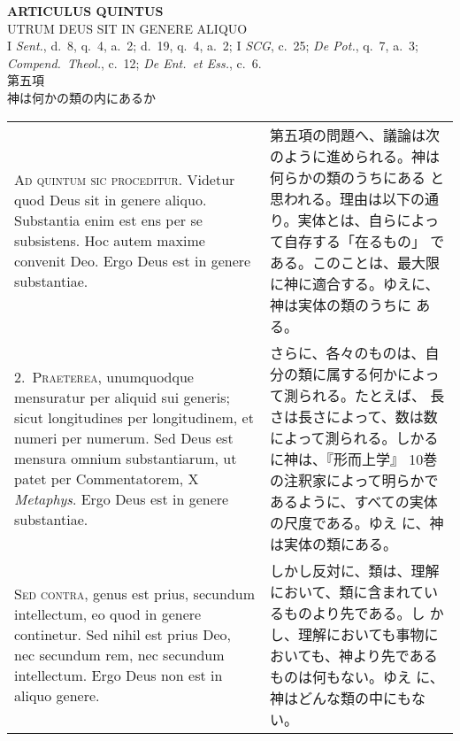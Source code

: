\documentclass[10pt]{jsarticle}
\begin{document}
\newpage
{}
\begin{center}
 {\Large {\bf ARTICULUS QUINTUS}}\\
 {\large UTRUM DEUS SIT IN GENERE ALIQUO}\\
 {\footnotesize I {\itshape Sent.}, d.~8, q.~4, a.~2; d.~19, q.~4, a.~2;
 I {\itshape SCG}, c.~25; {\itshape De Pot.}, q.~7, a.~3; {\itshape
 Compend.~Theol.}, c.~12; {\itshape De Ent.~et Ess.}, c.~6.}\\
 {\Large 第五項\\神は何かの類の内にあるか}
\end{center}

\begin{longtable}{p{21em}p{21em}}
{\huge A}{\scshape d quintum sic proceditur}. Videtur quod Deus sit in
 genere aliquo. Substantia enim est ens per se subsistens. Hoc autem
 maxime convenit Deo. Ergo Deus est in genere substantiae.

&

第五項の問題へ、議論は次のように進められる。神は何らかの類のうちにある
と思われる。理由は以下の通り。実体とは、自らによって自存する「在るもの」
である。このことは、最大限に神に適合する。ゆえに、神は実体の類のうちに
ある。

\\

2.~{\scshape Praeterea}, unumquodque mensuratur per aliquid sui
generis; sicut longitudines per longitudinem, et numeri per
numerum. Sed Deus est mensura omnium substantiarum, ut patet per
Commentatorem, X {\itshape Metaphys}. Ergo Deus est in genere
substantiae.

&


さらに、各々のものは、自分の類に属する何かによって測られる。たとえば、
長さは長さによって、数は数によって測られる。しかるに神は、『形而上学』
10巻の注釈家によって明らかであるように、すべての実体の尺度である。ゆえ
に、神は実体の類にある。

\\

{\scshape Sed contra}, genus est prius, secundum intellectum, eo quod
in genere continetur. Sed nihil est prius Deo, nec secundum rem, nec
secundum intellectum. Ergo Deus non est in aliquo genere.

&

しかし反対に、類は、理解において、類に含まれているものより先である。し
かし、理解においても事物においても、神より先であるものは何もない。ゆえ
に、神はどんな類の中にもない。

\\



\end{longtable}
\end{document}

